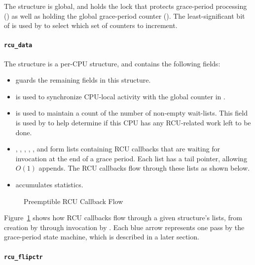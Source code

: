 The  structure is global, and holds the lock
that protects grace-period processing () as well
as holding the global grace-period counter ().
The least-significant bit of  is used by
 to select which set of counters to increment.
\fi

\paragraph{{\tt rcu\_data}}
\label{app:rcuimpl:rcu_data}

The  structure is a per-CPU structure, and
contains the following fields:

\begin{itemize}
\item	{} guards the remaining fields in this structure.
\item	{} is used to synchronize CPU-local
	activity with the global counter in .
\item	{} is used to maintain a count of the
	number of non-empty wait-lists.
	This field is used by  to help determine
	if this CPU has any RCU-related work left to be done.
\item	{}, , ,
	, , and
	 form lists containing
	RCU callbacks that are waiting for invocation at the end
	of a grace period.
	Each list has a tail pointer, allowing $O\left(1\right)$ appends.
	The RCU callbacks flow through these lists as shown below.
\item	{} accumulates statistics.
\end{itemize}

\begin{figure}[htb]
\centering
{}
\caption{Preemptible RCU Callback Flow}
\label{app:rcuimpl:Preemptible RCU Callback Flow}
\end{figure}

Figure~\ref{app:rcuimpl:Preemptible RCU Callback Flow}
shows how RCU callbacks flow through a given
 structure's lists, from creation by
 through invocation by
.
Each blue arrow represents one pass by the grace-period state machine,
which is described in a later section.



\paragraph{{\tt rcu\_flipctr}}
\label{app:rcuimpl:rcu_flipctr}

